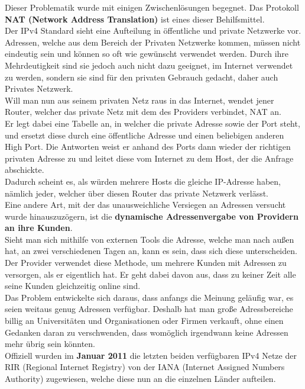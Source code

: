 \documentclass[12pt,a4paper]{report}
\begin{document}
\begin{onehalfspace}
Dieser Problematik wurde mit einigen Zwischenlösungen begegnet. Das Protokoll \textbf{NAT (Network Address Translation)} ist eines dieser Behilfsmittel.\\
Der IPv4 Standard sieht eine Aufteilung in öffentliche und private Netzwerke vor. Adressen, welche aus dem Bereich der Privaten Netzwerke kommen, müssen nicht eindeutig sein und können so oft wie gewünscht verwendet werden. Durch ihre Mehrdeutigkeit sind sie jedoch auch nicht dazu geeignet, im Internet verwendet zu werden, sondern sie sind für den privaten Gebrauch gedacht, daher auch Privates Netzwerk.\\
Will man nun aus seinem privaten Netz raus in das Internet, wendet jener Router, welcher das private Netz mit dem des Providers verbindet, NAT an.\\
Er legt dabei eine Tabelle an, in welcher die private Adresse sowie der Port steht, und ersetzt diese durch eine öffentliche Adresse und einen beliebigen anderen High Port. Die Antworten weist er anhand des Ports dann wieder der richtigen privaten Adresse zu und leitet diese vom Internet zu dem Host, der die Anfrage abschickte.\\
Dadurch scheint es, als würden mehrere Hosts die gleiche IP-Adresse haben, nämlich jeder, welcher über diesen Router das private Netzwerk verlässt.\\

Eine andere Art, mit der das unausweichliche Versiegen an Adressen versucht wurde hinauszuzögern, ist die \textbf{dynamische Adressenvergabe von Providern an ihre Kunden}.\\
Sieht man sich mithilfe von externen Tools die Adresse, welche man nach außen hat, an zwei verschiedenen Tagen an, kann es sein, dass sich diese unterscheiden.\\
Der Provider verwendet diese Methode, um mehrere Kunden mit Adressen zu versorgen, als er eigentlich hat. Er geht dabei davon aus, dass zu keiner Zeit alle seine Kunden gleichzeitig online sind.\\

Das Problem entwickelte sich daraus, dass anfangs die Meinung geläufig war, es seien weitaus genug Adressen verfügbar. Deshalb hat man große Adressbereiche billig an Universitäten und Organisationen oder Firmen verkauft, ohne einen Gedanken daran zu verschwenden, dass womöglich irgendwann keine Adressen mehr übrig sein könnten.\\
Offiziell wurden im \textbf{Januar 2011} die letzten beiden verfügbaren IPv4 Netze der RIR (Regional Internet Registry) von der IANA (Internet Assigned Numbers Authority) zugewiesen, welche diese nun an die einzelnen Länder aufteilen.\\


\end{onehalfspace}
\end{document}

